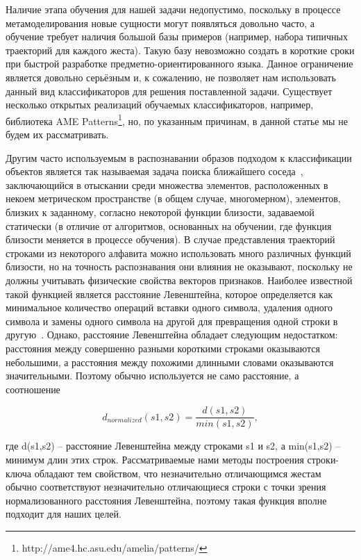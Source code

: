 \documentclass[a5paper]{article}
\begin{document}
Наличие этапа обучения для нашей задачи недопустимо, поскольку в процессе метамоделирования новые сущности могут появляться довольно часто, а обучение требует наличия большой базы примеров (например, набора типичных траекторий для каждого жеста). Такую базу невозможно создать в короткие сроки при быстрой разработке предметно-ориентированного языка. Данное ограничение является довольно серьёзным и, к сожалению, не позволяет нам использовать данный вид классификаторов для решения поставленной задачи. Существует несколько открытых реализаций обучаемых классификаторов, например, библиотека AME Patterns\footnote{http://ame4.hc.asu.edu/amelia/patterns/}, но, по указанным причинам, в данной статье мы не будем их рассматривать.

Другим часто используемым в распознавании образов подходом к классификации объектов является так называемая задача поиска ближайшего соседа~\cite{nns1, nns2}, заключающийся в отыскании среди множества элементов, расположенных в некоем метрическом пространстве (в общем случае, многомерном), элементов, близких к заданному, согласно некоторой функции близости, задаваемой статически (в отличие от алгоритмов, основанных на обучении, где функция близости меняется в процессе обучения). В случае представления траекторий строками из некоторого алфавита можно использовать много различных функций близости, но на точность распознавания они влияния не оказывают, поскольку не должны учитывать физические свойства векторов признаков. Наиболее известной такой функцией является расстояние Левенштейна, которое определяется как минимальное количество операций вставки одного символа, удаления одного символа и замены одного символа на другой для превращения одной строки в другую~\cite{levenshtein}. Однако, расстояние Левенштейна обладает следующим недостатком: расстояния между совершенно разными короткими строками оказываются небольшими, а расстояния между похожими длинными словами оказываются значительными. Поэтому обычно используется не само расстояние, а соотношение 

\begin{equation}
\label{levenshtein}
d_{normalized}(s1,s2) = \frac{d(s1,s2)}{min(s1,s2)},
\end{equation}

где d(s1,s2) -- расстояние Левенштейна между строками s1 и s2, а min(s1,s2) -- минимум длин этих строк. Рассматриваемые нами методы построения строки-ключа обладают тем свойством, что незначительно отличающимся жестам обычно соответствуют незначительно отличающиеся строки с точки зрения нормализованного расстояния Левенштейна, поэтому такая функция вполне подходит для наших целей.
\end{document}
